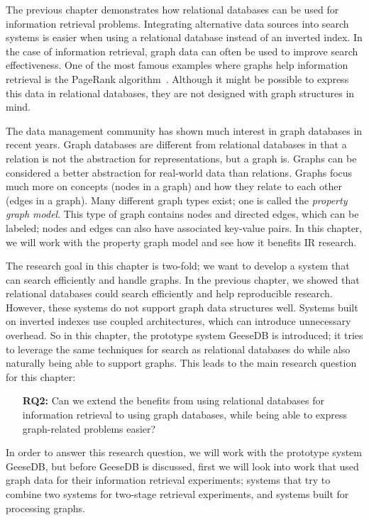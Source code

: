 The previous chapter demonstrates how relational databases can be used for information retrieval problems. Integrating alternative data sources into search systems is easier when using a relational database instead of an inverted index. In the case of information retrieval, graph data can often be used to improve search effectiveness. One of the most famous examples where graphs help information retrieval is the PageRank algorithm~\citep{pagerank}. Although it might be possible to express this data in relational databases, they are not designed with graph structures in mind. 

The data management community has shown much interest in graph databases in recent years. Graph databases are different from relational databases in that a relation is not the abstraction for representations, but a graph is. Graphs can be considered a better abstraction for real-world data than relations. Graphs focus much more on concepts (nodes in a graph) and how they relate to each other (edges in a graph). Many different graph types exist; one is called the \emph{property graph model}. This type of graph contains nodes and directed edges, which can be labeled; nodes and edges can also have associated key-value pairs. In this chapter, we will work with the property graph model and see how it benefits IR research.  %

The research goal in this chapter is two-fold; we want to develop a system that can search efficiently and handle graphs. In the previous chapter, we showed that relational databases could search efficiently and help reproducible research. However, these systems do not support graph data structures well. Systems built on inverted indexes use coupled architectures, which can introduce unnecessary overhead. So in this chapter, the prototype system GeeseDB is introduced; it tries to leverage the same techniques for search as relational databases do while also naturally being able to support graphs. This leads to the main research question for this chapter:

\begin{itemize}
	\item[\textbf{RQ2:}] Can we extend the benefits from using relational databases for information retrieval to using graph databases, while being able to express graph-related problems easier?
\end{itemize} 

In order to answer this research question, we will work with the prototype system GeeseDB, but before GeeseDB is discussed, first we will look into work that used graph data for their information retrieval experiments; systems that try to combine two systems for two-stage retrieval experiments, and systems built for processing graphs.

